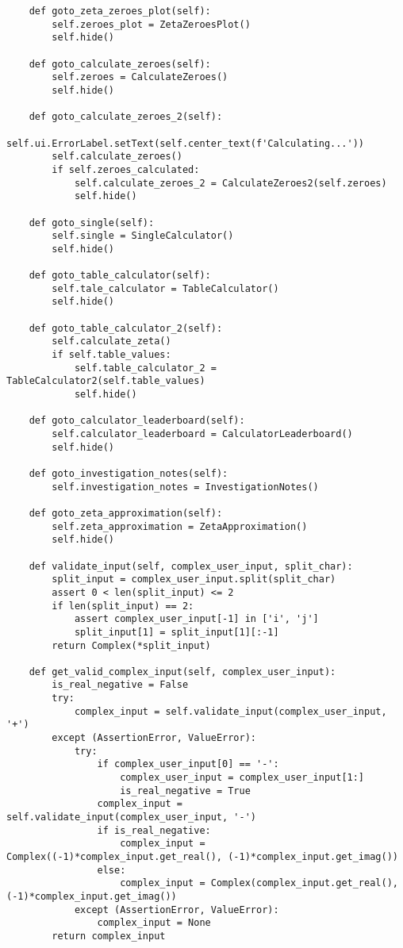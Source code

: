 \documentclass{article}
\begin{document}
\begin{lstlisting}
    def goto_zeta_zeroes_plot(self):
        self.zeroes_plot = ZetaZeroesPlot()
        self.hide()

    def goto_calculate_zeroes(self):
        self.zeroes = CalculateZeroes()
        self.hide()

    def goto_calculate_zeroes_2(self):
        self.ui.ErrorLabel.setText(self.center_text(f'Calculating...'))
        self.calculate_zeroes()
        if self.zeroes_calculated:
            self.calculate_zeroes_2 = CalculateZeroes2(self.zeroes)
            self.hide()

    def goto_single(self):
        self.single = SingleCalculator()
        self.hide()

    def goto_table_calculator(self):
        self.tale_calculator = TableCalculator()
        self.hide()

    def goto_table_calculator_2(self):
        self.calculate_zeta()
        if self.table_values:
            self.table_calculator_2 = TableCalculator2(self.table_values)
            self.hide()

    def goto_calculator_leaderboard(self):
        self.calculator_leaderboard = CalculatorLeaderboard()
        self.hide()

    def goto_investigation_notes(self):
        self.investigation_notes = InvestigationNotes()

    def goto_zeta_approximation(self):
        self.zeta_approximation = ZetaApproximation()
        self.hide()

    def validate_input(self, complex_user_input, split_char):
        split_input = complex_user_input.split(split_char)
        assert 0 < len(split_input) <= 2
        if len(split_input) == 2:
            assert complex_user_input[-1] in ['i', 'j']
            split_input[1] = split_input[1][:-1]
        return Complex(*split_input)

    def get_valid_complex_input(self, complex_user_input):
        is_real_negative = False
        try:
            complex_input = self.validate_input(complex_user_input, '+')
        except (AssertionError, ValueError):
            try:
                if complex_user_input[0] == '-':
                    complex_user_input = complex_user_input[1:]
                    is_real_negative = True
                complex_input = self.validate_input(complex_user_input, '-')
                if is_real_negative:
                    complex_input = Complex((-1)*complex_input.get_real(), (-1)*complex_input.get_imag())
                else:
                    complex_input = Complex(complex_input.get_real(), (-1)*complex_input.get_imag())
            except (AssertionError, ValueError):
                complex_input = None
        return complex_input



\end{lstlisting}
\end{document}
